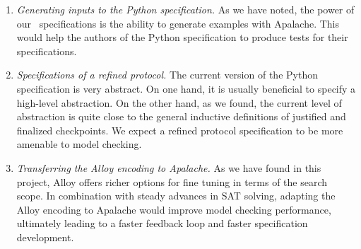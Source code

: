 
\begin{enumerate}

  \item \emph{Generating inputs to the Python specification.} As we have noted,
    the power of our~\tlap{} specifications is the ability to generate examples
    with Apalache. This would help the authors of the Python specification to
    produce tests for their specifications.

  \item \emph{Specifications of a refined protocol.} The current version of the
    Python specification is very abstract. On one hand, it is usually
    beneficial to specify a high-level abstraction. On the other hand, as we
    found, the current level of abstraction is quite close to the general
    inductive definitions of justified and finalized checkpoints. We expect a
    refined protocol specification to be more amenable to model checking.

  \item \emph{Transferring the Alloy encoding to Apalache.} As we have found in
    this project, Alloy offers richer options for fine tuning in terms of the
    search scope. In combination with steady advances in SAT solving, adapting
    the Alloy encoding to Apalache would improve model checking performance,
    ultimately leading to a faster feedback loop and faster specification
    development.

\end{enumerate}

